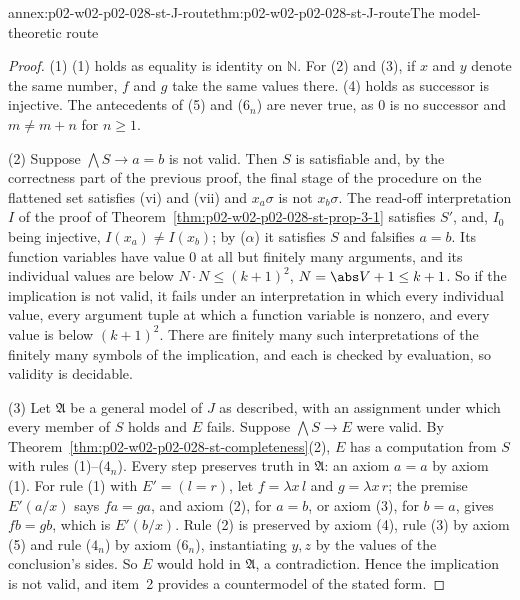\begin{annexitem}{annex:p02-w02-p02-028-st-J-route}{thm:p02-w02-p02-028-st-J-route}{The model-theoretic route}
\begin{proof}
(1) (1) holds as equality is identity on \(\mathbb N\).  For (2) and (3), if
\(x\) and \(y\) denote the same number, \(f\) and \(g\) take the same values
there.  (4) holds as successor is injective.  The antecedents of (5) and
(\(6_n\)) are never true, as \(0\) is no successor and \(m\neq m+n\) for
\(n\geq1\).

(2) Suppose \(\bigwedge S\to a=b\) is not valid.  Then \(S\) is satisfiable
and, by the correctness part of the previous proof, the final stage of the
procedure on the flattened set satisfies (vi) and (vii) and
\(x_a\sigma\) is not \(x_b\sigma\).  The read-off interpretation \(I\) of the
proof of Theorem~\ref{thm:p02-w02-p02-028-st-prop-3-1} satisfies \(S'\), and,
\(I_0\) being injective, \(I(x_a)\neq I(x_b)\); by (\(\alpha\)) it satisfies
\(S\) and falsifies \(a=b\).  Its function variables have value \(0\) at all
but finitely many arguments, and its individual values are below
\(N\cdot N\leq(k+1)^2\), \(N=\abs V+1\leq k+1\).  So if the implication is not
valid, it fails under an interpretation in which every individual value,
every argument tuple at which a function variable is nonzero, and every
value is below \((k+1)^2\).  There are finitely many such interpretations of
the finitely many symbols of the implication, and each is checked by
evaluation, so validity is decidable.

(3) Let \(\mathfrak A\) be a general model of \(J\) as described, with an
assignment under which every member of \(S\) holds and \(E\) fails.  Suppose
\(\bigwedge S\to E\) were valid.  By
Theorem~\ref{thm:p02-w02-p02-028-st-completeness}(2), \(E\) has a
computation from \(S\) with rules (1)--(\(4_n\)).  Every step preserves truth
in \(\mathfrak A\): an axiom \(a=a\) by axiom (1).  For rule (1) with
\(E'=(l=r)\), let \(f=\lambda x\,l\) and \(g=\lambda x\,r\); the premise
\(E'(a/x)\) says \(fa=ga\), and axiom (2), for \(a=b\), or axiom (3), for
\(b=a\), gives \(fb=gb\), which is \(E'(b/x)\).  Rule (2) is preserved by
axiom (4), rule (3) by axiom (5) and rule (\(4_n\)) by axiom (\(6_n\)),
instantiating \(y,z\) by the values of the conclusion's sides.  So \(E\)
would hold in \(\mathfrak A\), a contradiction.  Hence the implication is not
valid, and item~2 provides a countermodel of the stated form.
\end{proof}
\end{annexitem}

